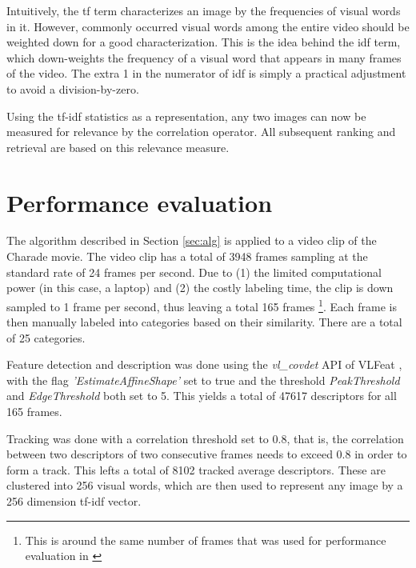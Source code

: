 \documentclass[conference]{IEEEtran}
\begin{document}
Intuitively, the tf term characterizes an image by the frequencies of visual words in it. However, commonly occurred visual words among the entire
video should be weighted down for a good characterization. This is the idea behind the idf term, which down-weights the frequency of a visual word
that appears in many frames of the video. The extra 1 in the numerator of idf is simply a practical adjustment to avoid a division-by-zero.

Using the tf-idf statistics as a representation, any two images can now be measured for relevance by the correlation operator. All subsequent ranking 
and retrieval are based on this relevance measure.

\section{Performance evaluation}
\label{sec:perf}
The algorithm described in Section \ref{sec:alg} is applied to a video clip of the Charade movie. The video clip has a total of 3948 frames sampling at
the standard rate of 24 frames per second. Due to (1) the limited computational power (in this case, a laptop) and (2) the costly labeling time, the clip is down sampled to 1 frame per second, thus leaving a total 165 frames \footnote{This is around the same number of frames that was used for performance evaluation in \cite{sivic2003video} }. Each frame is then manually labeled into categories based on their similarity. There are 
a total of 25 categories.

Feature detection and description was done using the  {\it vl\_covdet} API of VLFeat \cite{vedaldi08vlfeat}, with the flag {\it 'EstimateAffineShape'} 
set to true and the threshold {\it PeakThreshold} and {\it EdgeThreshold} both set to 5. This yields a total of 47617 descriptors for all 165 frames.

Tracking was done with a correlation threshold set to 0.8, that is, the correlation between two descriptors of two consecutive frames needs to exceed 0.8
in order to form a track. This lefts a total of 8102 tracked average descriptors. These are clustered into 256 visual words, which are then used to represent 
any image by a 256 dimension tf-idf vector.
\end{document}
